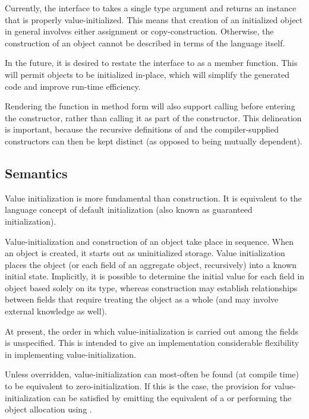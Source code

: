 \begin{future}

Currently, the interface to  takes a single type argument and
returns an instance that is properly value-initialized.  This means that
creation of an initialized object in general involves either assignment or
copy-construction.  Otherwise, the construction of an object cannot be described
in terms of the language itself.

In the future, it is desired to restate the interface to  as
a member function.  This will permit objects to be initialized in-place, which
will simplify the generated code and improve run-time efficiency.

Rendering the  function in method form will also support
calling  before entering the constructor, rather than calling
it as part of the constructor.  This delineation is important, because the
recursive definitions of  and the compiler-supplied
constructors can then be kept distinct (as opposed to being mutually dependent).

\end{future}

\subsection{Semantics}

Value initialization is more fundamental than construction.  It is equivalent to
the language concept of default initialization (also known as guaranteed
initialization).  

Value-initialization and construction of an object take place in sequence.  When
an object is created, it starts out as uninitialized storage.  Value
initialization places the object (or each field of an aggregate object,
recursively) into a known initial state.  Implicitly, it is possible to
determine the initial value for each field in object based solely on its type, whereas
construction may establish relationships between fields that require treating
the object as a whole (and may involve external knowledge as well).

\begin{note}
At present, the order in which value-initialization is carried out among the
fields is unspecified.  This is intended to give an implementation considerable
flexibility in implementing value-initialization.

Unless overridden, value-initialization can most-often be found (at compile
time) to be equivalent to zero-initialization.  If this is the case, the
provision for value-initialization can be satisfied by emitting the equivalent
of a  or performing the object allocation
using .
\end{note}

